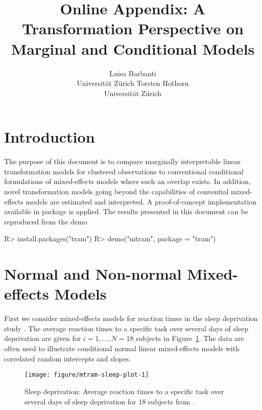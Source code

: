 \documentclass[article,nojss,shortnames]{jss}\usepackage[]{graphicx}\usepackage[]{xcolor}
\author{Luisa Barbanti \\ Universit\"at Z\"urich \And Torsten Hothorn \\ Universit\"at Z\"urich}
\title{Online Appendix: A Transformation Perspective on Marginal and Conditional Models}
\begin{document}
% 







\section{Introduction}

The purpose of this document is to compare marginally interpretable linear
transformation models for clustered observations
\citep{Hothorn_2019_mtram} to conventional conditional
formulations of mixed-effects models where such an overlap exists.  In
addition, novel transformation models going beyond the capabilities of
convential mixed-effects models are estimated and interpreted.  A
proof-of-concept implementation available in package
 \citep{pkg:tram} is applied. 
The results presented in this
document can be reproduced from the  demo
\begin{Schunk}
\begin{Sinput}
R> install.packages("tram")
R> demo("mtram", package = "tram")
\end{Sinput}
\end{Schunk}

\section{Normal and Non-normal Mixed-effects Models}

First we consider mixed-effects models for reaction times in the sleep
deprivation study \citep{Belenky_Wesensten_Thorne_2003}.  The average
reaction times to a specific task over several days of sleep deprivation are
given for $i = 1, \dots, N = 18$ subjects in Figure~\ref{fig:sleepstudy}.
The data are often used to illustrate
conditional normal linear mixed-effects models with correlated random
intercepts and slopes. %

\begin{figure}[t]
\begin{Schunk}


{\centering \texttt{[image: figure/mtram-sleep-plot-1]} 

}

\end{Schunk}
\caption{Sleep deprivation: Average reaction times to a specific task over several days 
         of sleep deprivation for $18$ subjects from
         \cite{Belenky_Wesensten_Thorne_2003}. \label{fig:sleepstudy}}
\end{figure}
\end{document}
